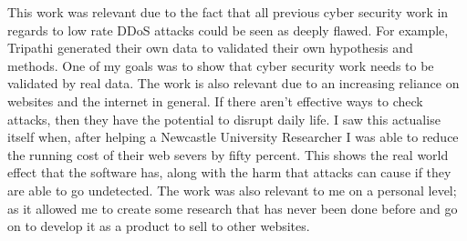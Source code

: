 This work was relevant due to the fact that all previous cyber security work in regards to low rate DDoS attacks could be seen as deeply flawed. For example, Tripathi generated their own data to validated their own hypothesis and methods. One of my goals was to show that cyber security work needs to be validated by real data. The work is also relevant due to an increasing reliance on websites and the internet in general. If there aren't effective ways to check attacks, then they have the potential to disrupt daily life. I saw this actualise itself when, after helping a Newcastle University Researcher I was able to reduce the running cost of their web severs by fifty percent. This shows the real world effect that the software has, along with the harm that attacks can cause if they are able to go undetected. The work was also relevant to me on a personal level; as it allowed me to create some research that has never been done before and go on to develop it as a product to sell to other websites.